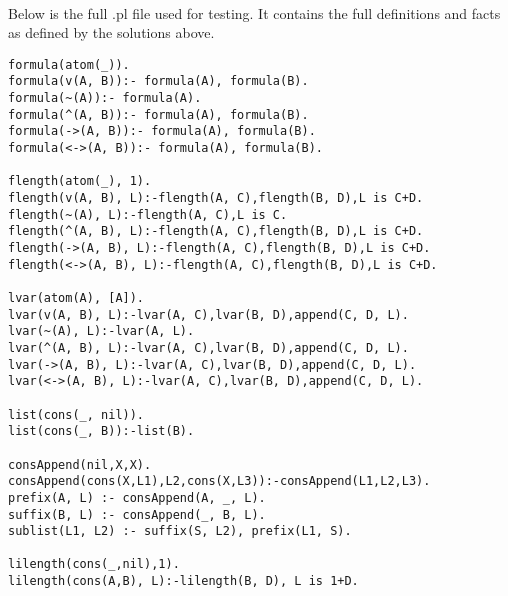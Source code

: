 \documentclass[fullpage]{article}
\begin{document}
\newpage
{} \\
Below is the full .pl file used for testing. It contains the full definitions and facts as defined by the solutions above.
\begin{verbatim}
formula(atom(_)).
formula(v(A, B)):- formula(A), formula(B).
formula(~(A)):- formula(A).
formula(^(A, B)):- formula(A), formula(B).
formula(->(A, B)):- formula(A), formula(B).
formula(<->(A, B)):- formula(A), formula(B).

flength(atom(_), 1).
flength(v(A, B), L):-flength(A, C),flength(B, D),L is C+D.
flength(~(A), L):-flength(A, C),L is C.
flength(^(A, B), L):-flength(A, C),flength(B, D),L is C+D.
flength(->(A, B), L):-flength(A, C),flength(B, D),L is C+D.
flength(<->(A, B), L):-flength(A, C),flength(B, D),L is C+D.

lvar(atom(A), [A]).
lvar(v(A, B), L):-lvar(A, C),lvar(B, D),append(C, D, L).
lvar(~(A), L):-lvar(A, L).
lvar(^(A, B), L):-lvar(A, C),lvar(B, D),append(C, D, L).
lvar(->(A, B), L):-lvar(A, C),lvar(B, D),append(C, D, L).
lvar(<->(A, B), L):-lvar(A, C),lvar(B, D),append(C, D, L).

list(cons(_, nil)).
list(cons(_, B)):-list(B).

consAppend(nil,X,X).
consAppend(cons(X,L1),L2,cons(X,L3)):-consAppend(L1,L2,L3).
prefix(A, L) :- consAppend(A, _, L).
suffix(B, L) :- consAppend(_, B, L).
sublist(L1, L2) :- suffix(S, L2), prefix(L1, S).

lilength(cons(_,nil),1).
lilength(cons(A,B), L):-lilength(B, D), L is 1+D.
\end{verbatim}
\end{document}

